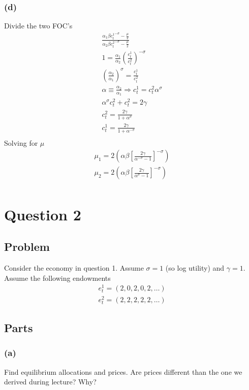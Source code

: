 \documentclass[10pt, a4paper]{article}
\begin{document}
    \subsubsection*{(d)}
      Divide the two FOC's
      \begin{gather*}
        \frac{\alpha_1\beta {c_t^1}^{-\sigma}-\frac{\mu}{2}}{\alpha_2\beta {c_t^2}^{-\sigma}-\frac{\mu}{2}} \\
        1 = \frac{\alpha_1}{\alpha_2} (\frac{c_t^1}{c_t^2})^{-\sigma} \\
        (\frac{\alpha_2}{\alpha_1})^{\sigma} = \frac{c_t^1}{c_t^2} \\
        \alpha\equiv\frac{\alpha_2}{\alpha_1} \Rightarrow c_t^1 = c_t^2 \alpha^{\sigma} \\
        \alpha^{\sigma}c_t^2+c_t^2 = 2\gamma \\
        c_t^2 = \frac{2\gamma}{1+\alpha^{\sigma}} \\
        c_t^1 = \frac{2\gamma}{1+\alpha^{-\sigma}} \\
      \end{gather*}
      Solving for $\mu$
      \begin{gather*}
        \mu_1 = 2(\alpha\beta[\frac{2\gamma}{\alpha^{-\sigma}-1}]^{-\sigma}) \\
        \mu_2 = 2(\alpha\beta[\frac{2\gamma}{\alpha^{\sigma}-1}]^{-\sigma}) \\
      \end{gather*}
\section*{Question 2}
  \subsection*{Problem}
    Consider the economy in question 1. Assume $\sigma = 1$ (so log utility) and $\gamma = 1$. Assume the following endowments
    \begin{gather*}
      e^1_t = (2,0,2,0,2,\ldots)\\
      e^2_t = (2,2,2,2,2,\ldots)
    \end{gather*}

  \subsection*{Parts}
    \subsubsection*{(a)}
      Find equilibrium allocations and prices. Are prices different than the one we derived during lecture? Why?
\end{document}
